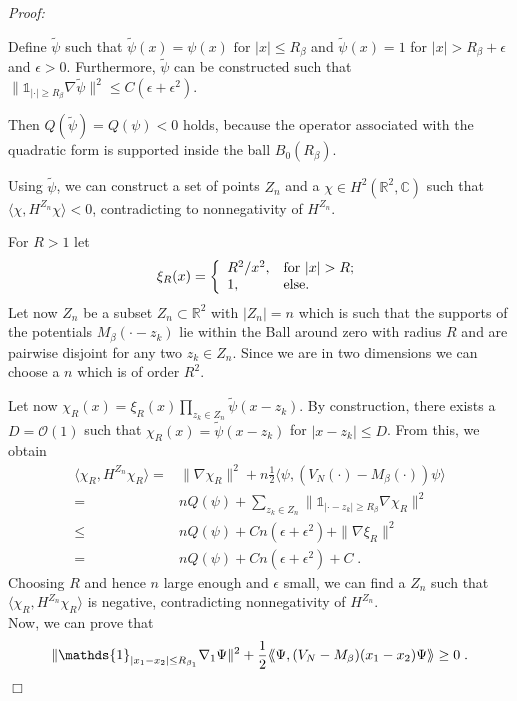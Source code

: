 \documentclass[11pt, english, american]{article}
\newcommand{\laa}{\langle\hspace{-0.08cm}\langle}
\newcommand{\raa}{\rangle\hspace{-0.08cm}\rangle}
\newenvironment{proof}{\emph{Proof:}}{\begin{flushright} $ \Box $ \end{flushright}}
\begin{document}
\begin{proof}
\begin{itemize}
Define $\tilde{\psi}$  such that
$ \tilde{\psi}(x)=\psi(x) \text{ for } |x| \leq R_{\beta}$ and $\tilde{\psi}(x)=1$ for $|x|> R_{\beta}+ \epsilon$ and $\epsilon>0$. Furthermore, $\tilde{\psi}$ can be constructed such that
$ \| \mathds{1}_{|\cdot| \geq R_\beta} \nabla \tilde{\psi}\|^2 \leq C (\epsilon+ \epsilon^ 2)$.

Then $Q ( \tilde{\psi})= Q (\psi)<0$ holds, because the operator associated with the quadratic form is supported inside the ball $B_0 (R_{\beta})$.

Using $\tilde{\psi}$, we can construct a set of points $Z_n$ and a $\chi\in H^2(\mathbb{R}^2, \mathbb{C})$ such that $\langle\chi,H^{Z_n}\chi\rangle<0$, contradicting to nonnegativity of $H^{Z_n}$.

For $R>1$ let
$$\xi_R(x)=\left\{
         \begin{array}{ll}
           R^2/x^2, & \hbox{for $|x|>R$;} \\
           1, & \hbox{else.}
         \end{array}
       \right.
$$
Let now $Z_n$ be a subset $Z_n\subset\mathbb{R}^2$ with $|Z_n|=n$ which is such that the supports of the potentials
$M_{\beta}(\cdot-z_k)$ lie within the Ball around zero with radius $R$ and are pairwise disjoint for any two $z_k\in Z_n$. Since we are in two dimensions we can choose a $n$ which is of order $R^2$.

Let now $\chi_R(x)=\xi_R (x) \prod_{z_k\in Z_n} \tilde{\psi}(x-z_k)$. By construction, there exists a $D = \mathcal{O}(1)$ such that
$ \chi_R(x)= \tilde{\psi}(x-z_k)$ for $ |x-z_k| \leq D $.
From this, we obtain 
\begin{align*}
\langle\chi_R,H^{Z_n}\chi_R\rangle
=&
\| \nabla \chi_R \|^2+
n\frac{1}{2}\langle\psi,(V_{N}(\cdot)-M_{\beta}(\cdot))\psi\rangle
\\
=&
n Q(\psi)+
\sum_{z_k \in Z_n}
\| \mathds{1}_{|\cdot-z_k|\geq R_\beta} \nabla \chi_R \|^2
\\
\leq &
n Q(\psi) +C n (\epsilon +\epsilon^2) + \| \nabla \xi_R  \|^2
\\
=&
n Q(\psi) +C n (\epsilon+ \epsilon^2) +C
\;.
\end{align*}
Choosing $R$ and hence $n$ large enough and $\epsilon$ small, we can find a $Z_n$
such that
$\langle \chi_R,H^{Z_n}\chi_R\rangle$ is negative, contradicting nonnegativity of $H^{Z_n}$.
\\
Now, we can prove that
\begin{align}
\label{poslemmac}
\|\mathds{1}_{|x_1-x_2|\leq  R_{\beta_1}}\nabla_1\Psi\|^2+\frac{1}{2}\laa\Psi,
(V_{N}-M_{\beta})(x_1-x_2)\Psi\raa\geq 0
\;.
\end{align}


\end{itemize}
\end{proof}
\end{document}

